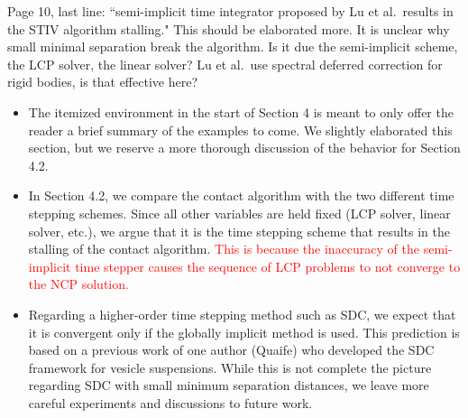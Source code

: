 \documentclass[11pt]{article}
\newcommand{\comment}[1]{{\color{blue} #1}}
\begin{document}
\noindent
\comment{Page 10, last line: ``semi-implicit time integrator proposed by
  Lu et al.~results in the STIV algorithm stalling." This should be
  elaborated more.  It is unclear why small minimal separation break the
  algorithm.  Is it due the semi-implicit scheme, the LCP solver, the
  linear solver?  Lu et al.~use spectral deferred correction for rigid
  bodies, is that effective here?}
\begin{itemize}
  \item The itemized environment in the start of Section 4 is meant to
    only offer the reader a brief summary of the examples to come.
    We slightly elaborated this section, but we reserve a more thorough
    discussion of the behavior for Section 4.2.

  \item In Section 4.2, we compare the contact algorithm with the two
    different time stepping schemes.  Since all other variables are held
    fixed (LCP solver, linear solver, etc.), we argue that it is the
    time stepping scheme that results in the stalling of the contact
    algorithm. \textcolor{red}{This is because the inaccuracy of the semi-implicit time stepper causes the sequence of LCP problems to not converge to the NCP solution.}

  \item Regarding a higher-order time stepping method such as SDC, we
    expect that it is convergent only if the globally implicit method is
    used.  This prediction is based on a previous work of one author
    (Quaife) who developed the SDC framework for vesicle suspensions.
    While this is not complete the picture regarding SDC with small
    minimum separation distances, we leave more careful experiments and
    discussions to future work.

\end{itemize}
\end{document}
